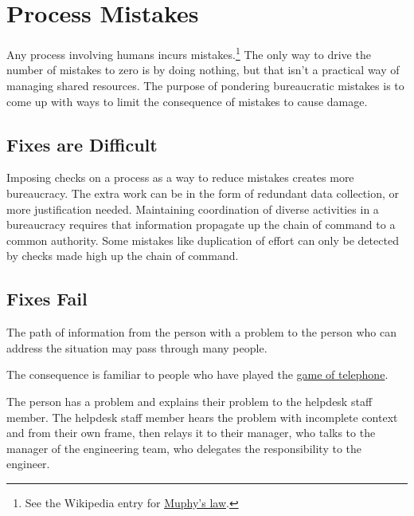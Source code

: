 \section{Process Mistakes\label{sec:process-mistakes}}

Any process involving humans incurs mistakes.\footnote{See the Wikipedia entry for \href{https://en.wikipedia.org/wiki/Murphy\%27s_law}{Muphy's law}.
} The only way to drive the number of mistakes to zero is by doing nothing, but that isn't a practical way of managing shared resources. 
The purpose of pondering bureaucratic mistakes is to come up with ways to limit the consequence of mistakes to cause damage. 

\subsection*{Fixes are Difficult}
Imposing checks on a process as a way to  reduce mistakes creates more bureaucracy. The extra work can be in the form of redundant data collection, or more justification needed. 
Maintaining coordination of diverse activities in a bureaucracy requires that information propagate up the chain of command to a common authority. Some mistakes like duplication of effort can only be detected by checks made high up the chain of command.


\subsection*{Fixes Fail}
The path of information from the person with a problem to the person who can address the situation may pass through many people. 

The consequence is familiar to people who have played the \href{https://en.wikipedia.org/wiki/Chinese_whispers\%23Game}{game of telephone}.
\begin{mdframed}[frametitle={Game of Telephone},frametitlerule=true,frametitlealignment=\centering]
The person has a problem and explains their problem to the helpdesk staff member. The helpdesk staff member hears the problem with incomplete context and from their own frame, then relays it to their manager, who talks to the manager of the engineering team, who delegates the responsibility to the engineer. 
\end{mdframed}

